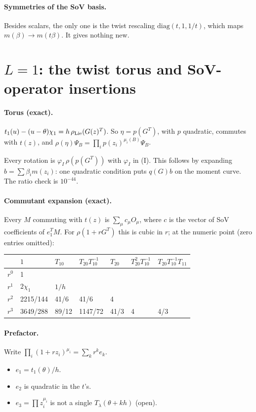 \documentclass[11pt]{article}
\begin{document}
\paragraph{Symmetries of the SoV basis.} Besides scalars, the only one is the twist rescaling $\mathrm{diag}(t,1,1/t)$, which maps $m(\beta)\to m(t\beta)$. It gives nothing new.

\section{$L=1$: the twist torus and SoV-operator insertions}

\paragraph{Torus (exact).} $t_1(u)-(u-\theta)\chi_1=h\,\rho_{\rm Lie}(G(z)^T)$. So $\eta=p(G^T)$, with $p$ quadratic, commutes with $t(z)$, and $\rho(\eta)\Psi_B=\prod_ip(z_i)^{\mu_i(B)}\Psi_B$.

Every rotation is $\varphi_I\,\rho(p(G^T))$ with $\varphi_I$ in (I). This follows by expanding $b=\sum\beta_im(z_i)$: one quadratic condition puts $q(G)b$ on the moment curve. The ratio check is $10^{-44}$.

\paragraph{Commutant expansion (exact).} Every $M$ commuting with $t(z)$ is $\sum_\mu c_\mu O_\mu$, where $c$ is the vector of SoV coefficients of $e_1^TM$. For $\rho(1+rG^T)$ this is cubic in $r$; at the numeric point (zero entries omitted):

\begin{center}
\begin{tabular}{lllllll}
\toprule
& $1$ & $T_{10}$ & $T_{20}T_{10}^{-1}$ & $T_{20}$ & $T_{20}^2T_{10}^{-1}$ & $T_{20}T_{10}^{-1}T_{11}$\\
\midrule
$r^0$ & 1 &&&&&\\
$r^1$ & $2\chi_1$ & $1/h$ &&&&\\
$r^2$ & 2215/144 & 41/6 & 41/6 & 4 &&\\
$r^3$ & 3649/288 & 89/12 & 1147/72 & 41/3 & 4 & 4/3\\
\bottomrule
\end{tabular}
\end{center}

\paragraph{Prefactor.} Write $\prod_i(1+rz_i)^{\mu_i}=\sum_kr^ke_k$.
\begin{itemize}
\item $e_1=t_1(\theta)/h$.
\item $e_2$ is quadratic in the $t$'s.
\item $e_3=\prod z_i^{\mu_i}$ is not a single $T_\lambda(\theta+kh)$ (open).
\end{itemize}
\end{document}
